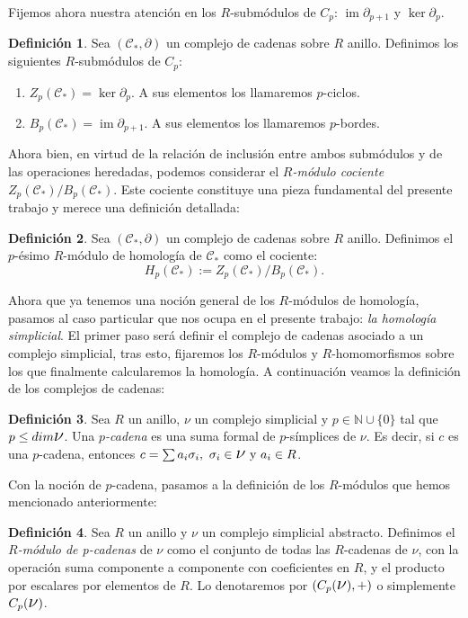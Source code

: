 \documentclass[12pt, a4paper, twoside]{book}
\numberwithin{equation}{section}
\theoremstyle{definition}
\newtheorem{defi}{Definición}[section]
\theoremstyle{remark}
\theoremstyle{plain}
\DeclareMathOperator{\Ima}{im}
\begin{document}
	Fijemos ahora nuestra atención en los $R$-submódulos de $C_{p}$: 
	$\Ima \partial_{p+1}$ y $\ker \partial_{p}$.

	\begin{defi}
		Sea $(\mathcal{C}_{*},\partial)$ un complejo de cadenas sobre 
		$R$ anillo. 
		Definimos los siguientes $R$-submódulos de $C_{p}$:
		\begin{enumerate}
			\item $Z_{p}(\mathcal{C}_{*})=\ker \partial_{p}$. A 
				sus elementos los llamaremos $p$-ciclos.
			\item $B_{p}(\mathcal{C}_{*})=\Ima\partial_{p+1}$. A 
				sus elementos los llamaremos $p$-bordes.
		\end{enumerate}
	\end{defi}

	Ahora bien, en virtud de la relación de inclusión entre ambos 
	submódulos y de las operaciones heredadas, podemos considerar el 
	\emph{$R$-módulo cociente} $Z_{p}(\mathcal{C}_{*})/B_{p}(
	\mathcal{C}_{*})$. Este cociente constituye una pieza fundamental del 
	presente trabajo y merece una definición detallada:

	\begin{defi}
		Sea $(\mathcal{C}_{*},\partial)$ un complejo de cadenas sobre 
		$R$ anillo. Definimos el $p$-ésimo $R$-módulo de homología de
		$\mathcal{C}_{*}$ como el cociente:
		$$H_{p}(\mathcal{C}_{*}):=Z_{p}(\mathcal{C}_{*})/B_{p}(
		\mathcal{C}_{*}).$$
	\end{defi}

	Ahora que ya tenemos una noción general de los $R$-módulos de 
	homología, pasamos al caso particular que nos ocupa en el presente 
	trabajo: \emph{la homología simplicial}. El primer paso será definir 
	el complejo de cadenas asociado a un complejo simplicial, tras esto, 
	fijaremos los $R$-módulos y $R$-homomorfismos sobre los que 
	finalmente calcularemos la homología. A continuación veamos la 
	definición de los complejos de cadenas:

	\begin{defi}
		Sea $R$ un anillo, {\Large $\nu$} un complejo simplicial y $p 
		\in \mathbb{N}\cup\{0\}$ 
		tal que $p\leq dim \text{{\Large $\nu$}}$. Una 
		\textit{$p$-cadena} es una suma formal de $p$-símplices de 
		{\Large $\nu$}. Es decir, si $c$ es una $p$-cadena, entonces 
		$c=\sum a_{i}\sigma_{i},\ \sigma_{i} \in 
		\text{{\Large $\nu$}}\text{ y } 
		a_{i} \in R$. 
	\end{defi}
	
	Con la noción de $p$-cadena, pasamos a la definición de los 
	$R$-módulos que hemos mencionado anteriormente:
	\begin{defi}
		Sea $R$ un anillo y {\Large $\nu$} un complejo simplicial 
		abstracto. Definimos
		el \textit{$R$-módulo de p-cadenas} de 
		{\Large $\nu$} como el conjunto de todas las $R$-cadenas de 
		{\Large $\nu$}, con la operación suma componente a componente 
		con coeficientes en $R$, y el producto por escalares 
		por elementos de $R$. Lo denotaremos por 
		$(C_{p}(\text{{\Large $\nu$}}), +)$ o simplemente 
		$C_{p}(\text{{\Large $\nu$}})$. 	
	\end{defi}
\end{document}
